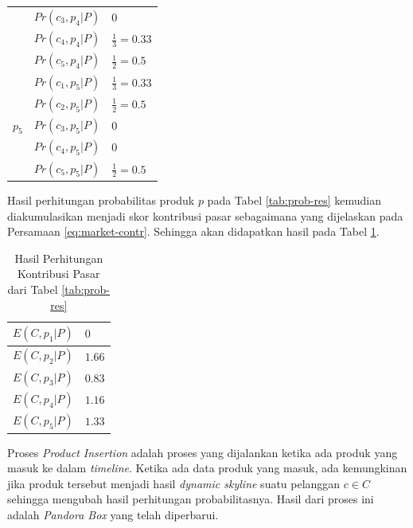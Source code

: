 \begin{small}
\begin{longtable}{|p{1.5cm}|p{3cm}|p{2.5cm}|}
		& $Pr(c_3, p_4|P)$ & $0$ \\ \cline{2-3}
		& $Pr(c_4, p_4|P)$ & $\frac{1}{3} = 0.33$  \\ \cline{2-3}
		& $Pr(c_5, p_4|P)$ & $\frac{1}{2} = 0.5$ \\ \hline
		\multirow{5}{*}{$p_5$} & $Pr(c_1, p_5|P)$ & $\frac{1}{3} = 0.33$ \\ \cline{2-3}
		& $Pr(c_2, p_5|P)$ & $\frac{1}{2} = 0.5$ \\ \cline{2-3}
		& $Pr(c_3, p_5|P)$ & $0$ \\ \cline{2-3}
		& $Pr(c_4, p_5|P)$ & $0$  \\ \cline{2-3}
		& $Pr(c_5, p_5|P)$ & $\frac{1}{2} = 0.5$ \\ \hline
	\end{longtable}
\end{small}


Hasil perhitungan probabilitas produk $p$ pada Tabel \ref{tab:prob-res} kemudian diakumulasikan menjadi skor kontribusi pasar sebagaimana yang dijelaskan pada Persamaan \ref{eq:market-contr}. Sehingga akan didapatkan hasil pada Tabel \ref{tab:mc-res}.

\begin{table}[H]
	\small
	\centering
	\begin{tabular}{|p{3cm}|p{2cm}|}
		\hline
		$E(C, p_1|P)$ & $0$ \\ \hline
		$E(C, p_2|P)$ & $1.66$ \\ \hline
		$E(C, p_3|P)$ & $0.83$ \\ \hline
		$E(C, p_4|P)$ & $1.16$ \\ \hline
		$E(C, p_5|P)$ & $1.33$ \\ \hline
	\end{tabular} 
	\caption{Hasil Perhitungan Kontribusi Pasar dari Tabel \ref{tab:prob-res}}
	\label{tab:mc-res}
\end{table}


Proses \textit{Product Insertion} adalah proses yang dijalankan ketika ada produk yang masuk ke dalam \textit{timeline}. Ketika ada data produk yang masuk, ada kemungkinan jika produk tersebut menjadi hasil \textit{dynamic skyline} suatu pelanggan $c \in C$ sehingga mengubah hasil perhitungan probabilitasnya. Hasil dari proses ini adalah \textit{Pandora Box} yang telah diperbarui.

